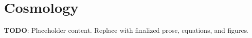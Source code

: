 
\section{Cosmology}
\label{sec:cosmology}

\textbf{TODO}: Placeholder content. Replace with finalized prose, equations, and figures.

